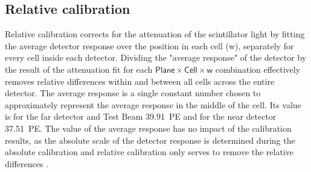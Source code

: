 \documentclass[12pt,a4paper]{article}
\begin{document}
\subsection{Relative calibration}


Relative calibration corrects for the attenuation of the scintillator light by fitting the average detector response over the position in each cell (w), separately for every cell inside each detector. Dividing the "average response" of the detector by the result of the attenuation fit for each $\textsf{Plane}\times\textsf{Cell}\times\textsf{w}$ combination effectively removes relative differences within and between all cells across the entire detector. The average response is a single constant number chosen to approximately represent the average response in the middle of the cell. Its value is for the far detector and Test Beam 39.91~PE and for the near detector 37.51~PE. The value of the average response has no impact of the calibration results, as the absolute scale of the detector response is determined during the absolute calibration and relative calibration only serves to remove the relative differences \cite{NOVA-doc-7410,NOVA-doc-13579-SAAttenuationAndThreshold}.
 
\end{document}
